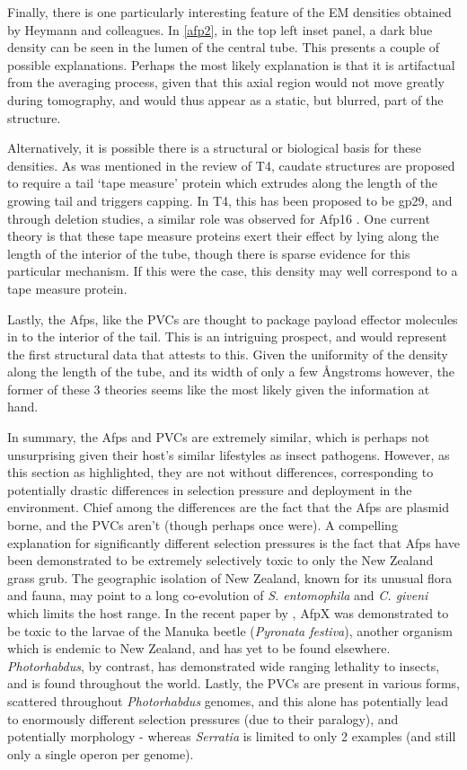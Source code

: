 Finally, there is one particularly interesting feature of the EM densities obtained by Heymann and colleagues. In \vref{afp2}, in the top left inset panel, a dark blue density can be seen in the lumen of the central tube. This presents a couple of possible explanations. Perhaps the most likely explanation is that it is artifactual from the averaging process, given that this axial region would not move greatly during tomography, and would thus appear as a static, but blurred, part of the structure.

Alternatively, it is possible there is a structural or biological basis for these densities. As was mentioned in the review of T4, caudate structures are proposed to require a tail `tape measure' protein which extrudes along the length of the growing tail and triggers capping. In T4, this has been proposed to be gp29, and through deletion studies, a similar role was observed for Afp16 \citep{Rybakova2013, Abuladze1994, Katsura1987}. One current theory is that these tape measure proteins exert their effect by lying along the length of the interior of the tube, though there is sparse evidence for this particular mechanism. If this were the case, this density may well correspond to a tape measure protein.

Lastly, the Afps, like the PVCs are thought to package payload effector molecules in to the interior of the tail. This is an intriguing prospect, and would represent the first structural data that attests to this. Given the uniformity of the density along the length of the tube, and its width of only a few \AA{}ngstroms however, the former of these 3 theories seems like the most likely given the information at hand.

In summary, the Afps and PVCs are extremely similar, which is perhaps not unsurprising given their host's similar lifestyles as insect pathogens. However, as this section as highlighted, they are not without differences, corresponding to potentially drastic differences in selection pressure and deployment in the environment. Chief among the differences are the fact that the Afps are plasmid borne, and the PVCs aren't (though perhaps once were). A compelling explanation for significantly different selection pressures is the fact that Afps have been demonstrated to be extremely selectively toxic to only the New Zealand grass grub. The geographic isolation of New Zealand, known for its unusual flora and fauna, may point to a long co-evolution of \emph{S. entomophila} and \emph{C. giveni} which limits the host range. In the recent paper by \cite{Hurst2018}, AfpX was demonstrated to be toxic to the larvae of the Manuka beetle (\emph{Pyronata festiva}), another organism which is endemic to New Zealand, and has yet to be found elsewhere. \emph{Photorhabdus}, by contrast, has demonstrated wide ranging lethality to insects, and is found throughout the world. Lastly, the PVCs are present in various forms, scattered throughout \emph{Photorhabdus} genomes, and this alone has potentially lead to enormously different selection pressures (due to their paralogy), and potentially morphology - whereas \emph{Serratia} is limited to only 2 examples (and still only a single operon per genome).


